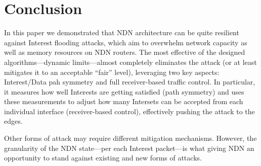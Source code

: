 \section{Conclusion}
\label{sec:conclusion}





In this paper we demonstrated that NDN architecture can be quite resilient against Interest flooding attacks, which aim to overwhelm network capacity as well as memory resources on NDN routers.
The most effective of the designed algorithms---dynamic limits---almost completely eliminates the attack (or at least mitigates it to an acceptable ``fair'' level), leveraging two key aspects: Interest/Data pah symmetry and full receiver-based traffic control.
In particular, it measures how well Interests are getting satisfied (path symmetry) and uses these measurements to adjust how many Intersets can be accepted from each individual interface (receiver-based control), effectively pushing the attack to the edges.

Other forms of attack may require different mitigation mechanisms.  
However, the granularity of the NDN state---per each Interest packet---is what giving NDN an opportunity to stand against existing and new forms of attacks.




